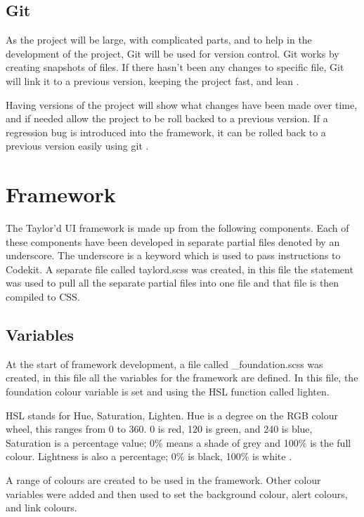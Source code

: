 \subsection*{Git}
As the project will be large, with complicated parts, and to help in the development of the project, Git will be used for version control. Git works by creating snapshots of files. If there hasn't been any changes to specific file, Git will link it to a previous version, keeping the project fast, and lean \citep{GIT05}.

Having versions of the project will show what changes have been made over time, and if needed allow the project to be roll backed to a previous version. If a regression bug is introduced into the framework, it can be rolled back to a previous version easily using git \citep{ATL16}.

\newpage
\section*{Framework}
The Taylor'd UI framework is made up from the following components. Each of these components have been developed in separate partial files denoted by an underscore. The underscore is a keyword which is used to pass instructions to Codekit. A separate file called taylord.scss was created, in this file the  statement was used to pull all the separate partial files into one file and that file is then compiled to \gls{CSS}. 

\subsection*{Variables}
At the start of framework development, a file called \_foundation.scss was created, in this file all the variables for the framework are defined. In this file, the foundation colour variable is set and using the \gls{HSL} function called lighten. 

\gls{HSL} stands for Hue, Saturation, Lighten. Hue is a degree on the RGB colour wheel, this ranges from 0 to 360. 0 is red, 120 is green, and 240 is blue, Saturation is a percentage value; 0\% means a shade of grey and 100\% is the full colour. Lightness is also a percentage; 0\% is black, 100\% is white \citep{HSL16}.

A range of colours are created to be used in the framework. Other colour variables were added and then used to set the background colour, alert colours, and link colours.

